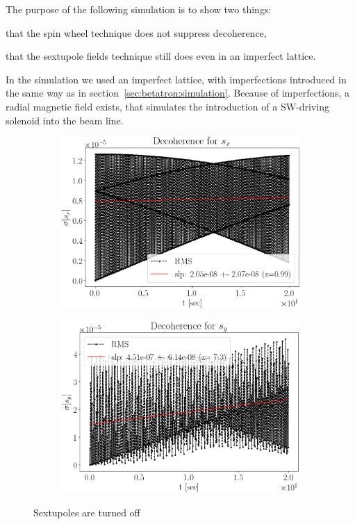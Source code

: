 \documentclass[]{elsarticle}
\begin{document}
The purpose of the following simulation is to show two things:
\begin{enumerate*}
\item that the spin wheel technique does not suppress decoherence,
\item that the sextupole fields technique still does even in an imperfect lattice.
\end{enumerate*}

In the simulation we used an imperfect lattice, with imperfections introduced in the same way as
in section~\ref{sec:betatron:simulation}. Because of imperfections, a radial magnetic field exists, that
simulates the introduction of a SW-driving solenoid into the beam line.

\begin{figure}[h]\centering
  \begin{subfigure}{\linewidth}
    \includegraphics[width=\linewidth]{img/decoh/SX_decoh_20sec_unopt}
  \end{subfigure}
  \begin{subfigure}{\linewidth}
    \includegraphics[width=\linewidth]{img/decoh/SY_decoh_20sec_unopt}
  \end{subfigure}
  \caption{Sextupoles are turned off}
\end{figure}
\end{document}
